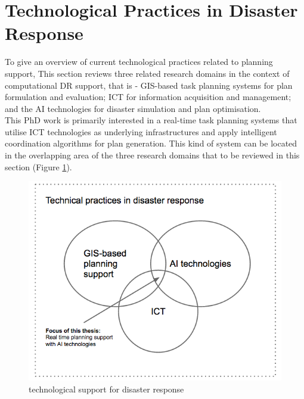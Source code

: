 \section{Technological Practices in Disaster Response} \label{sec:LRApplicationAreas}
To give an overview of current technological practices related to planning support, This section reviews three related research domains in the context of computational DR support, that is - \ac{GIS}-based task planning systems for plan formulation and evaluation; \acf{ICT} for information acquisition and management; and the \acf{AI} technologies for disaster simulation and plan optimisation.  \\

This PhD work is primarily interested in a real-time task planning systems that utilise \ac{ICT} technologies as underlying infrastructures and apply intelligent coordination algorithms for plan generation. This kind of system can be located in the overlapping area of the three research domains that to be reviewed in this section (Figure \ref{fig:SystemFraming}).\\

\begin{figure}[h]
  \centering
  \includegraphics[width=1\textwidth]{img/Background/SystemFraming}
  \caption{technological support for disaster response}
  \label{fig:SystemFraming}
\end{figure} 

